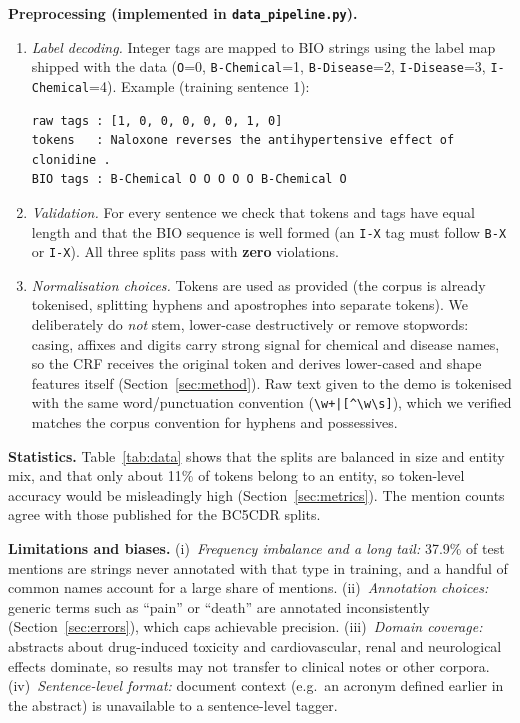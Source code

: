 \documentclass[10pt,a4paper]{article}
\begin{document}
\textbf{Preprocessing (implemented in \texttt{data\_pipeline.py}).}
\begin{enumerate}
\item \emph{Label decoding.} Integer tags are mapped to BIO strings using the label map shipped with the data
(\texttt{O}=0, \texttt{B-Chemical}=1, \texttt{B-Disease}=2, \texttt{I-Disease}=3, \texttt{I-Chemical}=4). Example (training sentence 1):
\begin{Verbatim}[fontsize=\footnotesize,xleftmargin=1em]
raw tags : [1, 0, 0, 0, 0, 0, 1, 0]
tokens   : Naloxone reverses the antihypertensive effect of clonidine .
BIO tags : B-Chemical O O O O O B-Chemical O
\end{Verbatim}
\item \emph{Validation.} For every sentence we check that tokens and tags have equal length and that the BIO sequence is well formed
(an \texttt{I-X} tag must follow \texttt{B-X} or \texttt{I-X}). All three splits pass with \textbf{zero} violations.
\item \emph{Normalisation choices.} Tokens are used as provided (the corpus is already tokenised, splitting hyphens and apostrophes into separate tokens).
We deliberately do \emph{not} stem, lower-case destructively or remove stopwords: casing, affixes and digits carry strong signal for chemical and disease names,
so the CRF receives the original token and derives lower-cased and shape features itself (Section~\ref{sec:method}). Raw text given to the demo is tokenised
with the same word/punctuation convention (\texttt{\textbackslash w+|[\textasciicircum\textbackslash w\textbackslash s]}), which we verified matches the corpus convention for hyphens and possessives.
\end{enumerate}



\textbf{Statistics.} Table~\ref{tab:data} shows that the splits are balanced in size and entity mix, and that only about 11\% of tokens belong to an entity,
so token-level accuracy would be misleadingly high (Section~\ref{sec:metrics}). The mention counts agree with those published for the BC5CDR splits.

\textbf{Limitations and biases.} (i)~\emph{Frequency imbalance and a long tail:} 37.9\% of test mentions are strings never annotated with that type in training,
and a handful of common names account for a large share of mentions. (ii)~\emph{Annotation choices:} generic terms such as ``pain'' or ``death'' are annotated
inconsistently (Section~\ref{sec:errors}), which caps achievable precision. (iii)~\emph{Domain coverage:} abstracts about drug-induced toxicity and
cardiovascular, renal and neurological effects dominate, so results may not transfer to clinical notes or other corpora. (iv)~\emph{Sentence-level format:}
document context (e.g.\ an acronym defined earlier in the abstract) is unavailable to a sentence-level tagger.
\end{document}
